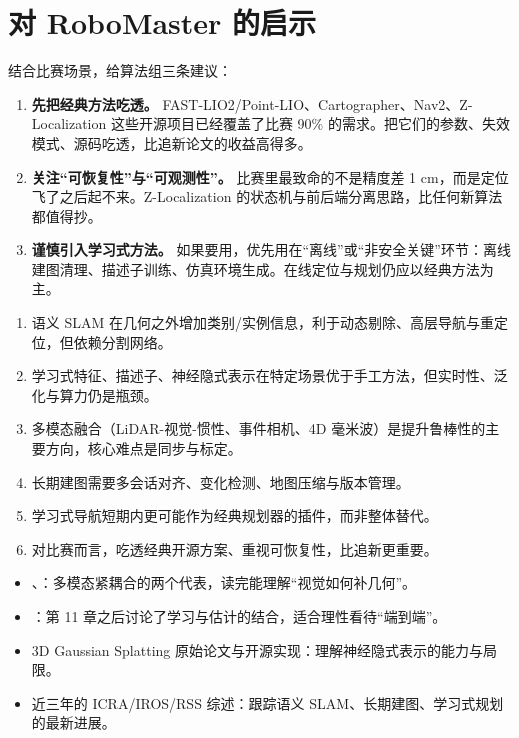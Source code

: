\section{对 RoboMaster 的启示}\label{sec:24-rm}

结合比赛场景，给算法组三条建议：
\begin{enumerate}
  \item \textbf{先把经典方法吃透。} FAST-LIO2/Point-LIO、Cartographer、Nav2、Z-Localization 这些开源项目已经覆盖了比赛 90\% 的需求。把它们的参数、失效模式、源码吃透，比追新论文的收益高得多。
  \item \textbf{关注“可恢复性”与“可观测性”。} 比赛里最致命的不是精度差 1 cm，而是定位飞了之后起不来。Z-Localization 的状态机与前后端分离思路，比任何新算法都值得抄。
  \item \textbf{谨慎引入学习式方法。} 如果要用，优先用在“离线”或“非安全关键”环节：离线建图清理、描述子训练、仿真环境生成。在线定位与规划仍应以经典方法为主。
\end{enumerate}

\begin{summary}

\begin{enumerate}
  \item 语义 SLAM 在几何之外增加类别/实例信息，利于动态剔除、高层导航与重定位，但依赖分割网络。
  \item 学习式特征、描述子、神经隐式表示在特定场景优于手工方法，但实时性、泛化与算力仍是瓶颈。
  \item 多模态融合（LiDAR-视觉-惯性、事件相机、4D 毫米波）是提升鲁棒性的主要方向，核心难点是同步与标定。
  \item 长期建图需要多会话对齐、变化检测、地图压缩与版本管理。
  \item 学习式导航短期内更可能作为经典规划器的插件，而非整体替代。
  \item 对比赛而言，吃透经典开源方案、重视可恢复性，比追新更重要。
\end{enumerate}

\end{summary}

\begin{reading}

\begin{itemize}
  \item \cite{yuan2024fastlivo2}、\cite{lin2022r3live}：多模态紧耦合的两个代表，读完能理解“视觉如何补几何”。
  \item \cite{barfoot2017state}：第 11 章之后讨论了学习与估计的结合，适合理性看待“端到端”。
  \item 3D Gaussian Splatting 原始论文与开源实现：理解神经隐式表示的能力与局限。
  \item 近三年的 ICRA/IROS/RSS 综述：跟踪语义 SLAM、长期建图、学习式规划的最新进展。
\end{itemize}


\end{reading}


